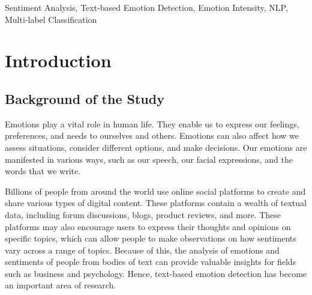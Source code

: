 \documentclass[journal]{./IEEE/IEEEtran}
\title{\SPTITLE}
\author{\ADVISEE~and~\ADVISER%
\REMARK
}
\begin{document}
\maketitle

\begin{abstract}
Emotion word intensity values were derived from an emotion intensity lexicon and used along with n-grams as baseline features to create a linear support vector machine classifier using the one-vs-rest strategy for multi-labeled emotion data. The model was trained on a dataset of English subtitles and compared to a similarly configured classifier which only included baseline features. The results showed that the classifier with emotion intensity values performed significantly better than the model without these features, achieving a macro f1 score of 0.4359. Furthermore, emotion intensity values for disgust, fear, joy, and sadness showed very high feature importance for their respective emotion labels. The findings suggest that the use of emotion word intensities can help classification models in identifying the emotions expressed within bodies of text.
\end{abstract}

\begin{keywords}
Sentiment Analysis, Text-based Emotion Detection, Emotion Intensity, NLP, Multi-label Classification
\end{keywords}

\section{Introduction}

\subsection{Background of the Study}
Emotions play a vital role in human life. They enable us to express our feelings, preferences, and needs to ourselves and others. Emotions can also affect how we assess situations, consider different options, and make decisions\cite{Alzoubi1}. Our emotions are manifested in various ways, such as our speech, our facial expressions, and the words that we write.

Billions of people from around the world use online social platforms to create and share various types of digital content. These platforms contain a wealth of textual data, including forum discussions, blogs, product reviews, and more\cite{Hartmann1}. These platforms may also encourage users to express their thoughts and opinions on specific topics, which can allow people to make observations on how sentiments vary across a range of topics. Because of this, the analysis of emotions and sentiments of people from bodies of text can provide valuable insights for fields such as business and psychology. Hence, text-based emotion detection has become an important area of research.
\end{document}
